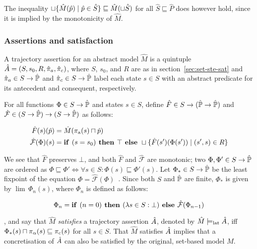\noindent The inequality $\sqcup \{ \hat M(\hat p) \mid \hat p \in \hat S \} \sqsubseteq \hat M(\sqcup \hat S)$ for all $\hat S \sqsubseteq \hat P$ does however hold, since it is implied by the monotonicity of $\hat M$.

\subsubsection{Assertions and satisfaction} \label{sec:lat-ste-sat}

A trajectory assertion for an abstract model $\hat M$ is a quintuple $\hat {A} = (S, s_{0}, R, \hat{\pi}_{a}, \hat{\pi}_{c})$, where $S$, $s_{0}$, and $R$ are as in section~\ref{sec:set-ste-sat} and $\hat{\pi}_{a} \in S \rightarrow \hat{\mathbb{P}}$ and $\hat{\pi}_{c} \in S \rightarrow \hat{\mathbb{P}}$ label each state $s \in S$ with an abstract predicate for its antecedent and consequent, respectively. 

For all functions $\Phi \in S \rightarrow \hat{\mathbb{P}}$ and states $s \in S$, define $\hat F \in S \rightarrow (\hat{\mathbb{P}} \rightarrow \hat{\mathbb{P}})$ and $\hat{\mathcal{F}} \in (S \rightarrow \hat{\mathbb{P}}) \rightarrow (S \rightarrow \hat{\mathbb{P}})$ as follows:

\begin{align}
\hat F(s)(\hat p) &= \hat M(\operatorname{\pi_{\textrm{a}}}(s) \sqcap \hat p) \\
\hat{\mathcal{F}}(\Phi)(s) &= \textrm{\textbf{if }} (s = s_{0}) \textrm{\textbf{ then }} \top \textrm{\textbf{ else }} \sqcup \{ \hat F(s')(\Phi(s')) \mid (s',s) \in R \}
\end{align}

\noindent We see that $\hat F$ preserves $\bot$, and both $\hat F$ and $\hat{\mathcal{F}}$ are monotonic; two $\Phi, \Phi' \in S \rightarrow \hat{\mathbb{P}}$ are ordered as $\Phi \sqsubseteq \Phi' \iff \forall s \in S : \Phi(s) \sqsubseteq \Phi'(s)$. Let $\Phi_{*} \in S \rightarrow \hat{\mathbb{P}}$ be the least fixpoint of the equation $\Phi = \hat{\mathcal{F}}(\Phi)$~\cite{davey2002}. Since both $S$ and $\hat{\mathbb{P}}$ are finite, $\Phi_{*}$ is given by $\lim \, \Phi_{n}(s)$, where $\Phi_{n}$ is defined as follows:

\begin{equation}
\Phi_{n} = \textrm{\textbf{if }} (n = 0) \textrm{\textbf{ then }} (\lambda s \in S : \bot) \textrm{\textbf{ else }} \hat{\mathcal{F}}(\Phi_{n-1})
\end{equation}

\noindent {}, and say that $\hat M$ \textit{satisfies} a trajectory assertion $\hat {A}$, denoted by $\hat M \models_{\textrm{lat}} \hat {A}$, iff $\Phi_{*}(s) \sqcap \pi_{\alpha}(s) \sqsubseteq \operatorname{\pi_{\textrm{c}}}(s)$ for all $s \in S$. That $\hat M$ satisfies $\hat {A}$ implies that a concretisation of $\hat {A}$ can also be satisfied by the original, set-based model $M$.

